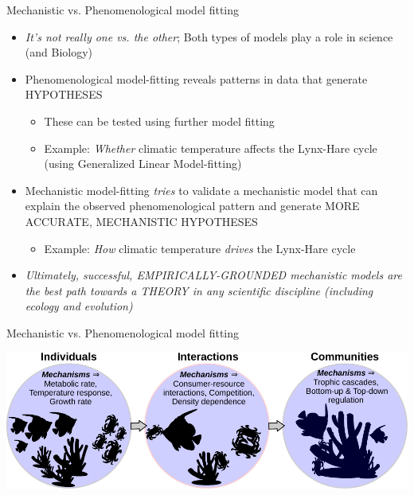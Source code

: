 \documentclass[xcolor=x11names,compress]{beamer}
\renewcommand{\(}{\begin{columns}}
\renewcommand{\)}{\end{columns}}
\newcommand{\<}[1]{\begin{column}{#1}}
\renewcommand{\>}{\end{column}}
\begin{document}
\begin{frame}{Mechanistic vs. Phenomenological model fitting}

	\begin{itemize}[<+->]\itemsep10pt
		\item {\it It's not really one vs. the other}; Both types of models play a role in science (and Biology)
		\item Phenomenological model-fitting reveals patterns in data that generate HYPOTHESES 
 		\begin{itemize}
			\item These can be tested using further model fitting
			\item Example: {\it Whether} climatic temperature affects the Lynx-Hare cycle (using Generalized Linear Model-fitting)
		\end{itemize} 

		\item Mechanistic model-fitting {\it tries} to validate a mechanistic model that can explain the observed phenomenological pattern and generate MORE ACCURATE, MECHANISTIC HYPOTHESES
		\begin{itemize}
			\item Example: {\it How} climatic temperature {\it drives} the Lynx-Hare cycle
		\end{itemize} 
		\item \it Ultimately, successful, EMPIRICALLY-GROUNDED mechanistic models are the best path towards a THEORY in any scientific discipline (including ecology and evolution)  
	  \end{itemize}
 
 
 \end{frame}

\begin{frame}{Mechanistic vs. Phenomenological model fitting}
	 
  \begin{center}
	  \includegraphics[width=\textwidth]{Mechanisms.pdf}
  \end{center} 
 
 \end{frame}
\end{document}
